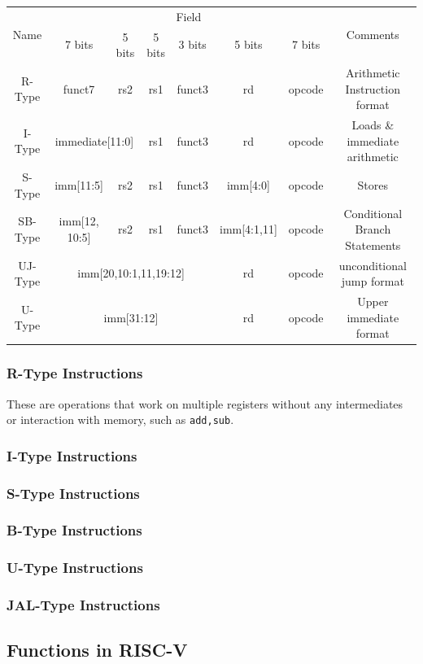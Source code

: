 \documentclass{article}
\begin{document}
\begin{tabular}{|c|c|c|c|c|c|c|c|}
	\hline\multirow{2}{*}{Name}&\multicolumn{6}{|c|}{Field}&\multirow{2}{*}{Comments}\\
	& 7 bits & 5 bits & 5 bits & 3 bits & 5 bits & 7 bits&\\
	\hline R-Type & funct7 & rs2 & rs1 & funct3 & rd & opcode & Arithmetic Instruction format\\
	\hline I-Type & \multicolumn{2}{|c|}{immediate[11:0]} & rs1 & funct3 & rd & opcode & Loads \& immediate arithmetic\\
	\hline S-Type & imm[11:5] & rs2 & rs1 & funct3 & imm[4:0] & opcode & Stores\\
	\hline SB-Type & imm[12, 10:5] & rs2 & rs1 & funct3 & imm[4:1,11] & opcode & Conditional Branch Statements\\
	\hline UJ-Type & \multicolumn{4}{|c|}{imm[20,10:1,11,19:12]} & rd & opcode & unconditional jump format\\
	\hline U-Type & \multicolumn{4}{|c|}{imm[31:12]} & rd & opcode & Upper immediate format\\ 
	\hline
\end{tabular}
\subsubsection{R-Type Instructions}
These are operations that work on multiple registers without any intermediates or interaction with memory, such as \verb|add,sub|.
\subsubsection{I-Type Instructions}
\subsubsection{S-Type  Instructions}
\subsubsection{B-Type  Instructions}
\subsubsection{U-Type  Instructions}
\subsubsection{JAL-Type  Instructions}
\subsection{Functions in RISC-V}
\end{document}
